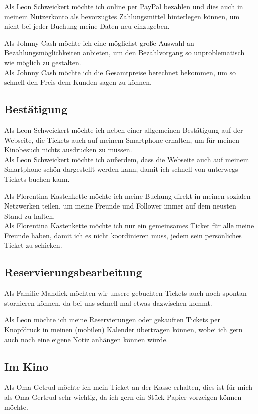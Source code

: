 Als Leon Schweickert möchte ich online per PayPal bezahlen und dies auch in meinem Nutzerkonto als bevorzugtes Zahlungsmittel hinterlegen können, um nicht bei jeder Buchung meine Daten neu einzugeben.

Als Johnny Cash möchte ich eine möglichst große Auswahl an Bezahlungsmöglichkeiten anbieten, um den Bezahlvorgang so unproblematisch wie möglich zu gestalten.
\\
Als Johnny Cash möchte ich die Gesamtpreise berechnet bekommen, um so schnell den Preis dem Kunden sagen zu können.

\subsection{Bestätigung}
Als Leon Schweickert möchte ich neben einer allgemeinen Bestätigung auf der Webseite, die Tickets auch auf meinem Smartphone erhalten, um für meinen Kinobesuch nichts ausdrucken zu müssen. \\
Als Leon Schweickert möchte ich außerdem, dass die Webseite auch auf meinem Smartphone schön dargestellt werden kann, damit ich schnell von unterwegs Tickets buchen kann.

Als Florentina Kastenkette möchte ich meine Buchung direkt in meinen sozialen Netzwerken teilen, um meine Freunde und Follower immer auf dem neusten Stand zu halten. \\
Als Florentina Kastenkette möchte ich nur ein gemeinsames Ticket für alle meine Freunde haben, damit ich es nicht koordinieren muss, jedem sein persönliches Ticket zu schicken.

\subsection{Reservierungsbearbeitung}
Als Familie Mandick möchten wir unsere gebuchten Tickets auch noch spontan stornieren können, da bei uns schnell mal etwas dazwischen kommt.

Als Leon möchte ich meine Reservierungen oder gekauften Tickets per Knopfdruck in meinen (mobilen) Kalender übertragen können, wobei ich gern auch noch eine eigene Notiz anhängen können würde.

\subsection{Im Kino}
Als Oma Getrud möchte ich mein Ticket an der Kasse erhalten, dies ist für mich als Oma Gertrud sehr wichtig, da ich gern ein Stück Papier vorzeigen können möchte.

